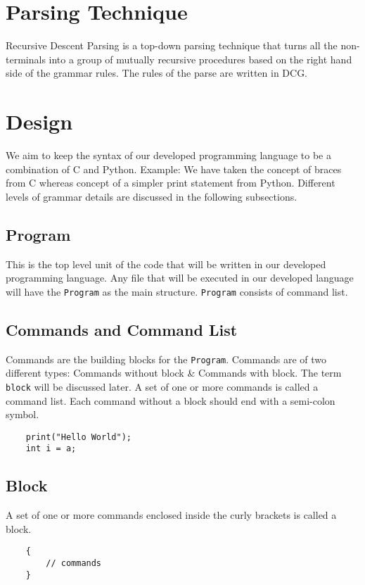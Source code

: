 \documentclass[12pt,letterpaper]{article}
\begin{document}
\section{Parsing Technique}
Recursive Descent Parsing is a top-down parsing technique that turns all the non-terminals into a group of mutually recursive procedures based on the right hand side of the grammar rules. The rules of the parse are written in DCG.

\section{Design}
We aim to keep the syntax of our developed programming language to be a combination of C and Python. Example: We have taken the concept of braces from C whereas concept of a simpler print statement from Python. Different levels of grammar details are discussed in the following subsections.

\subsection{Program}
This is the top level unit of the code that will be written in our developed programming language. Any file that will be executed in our developed language will have the \texttt{Program} as the main structure.
\texttt{Program} consists of command list.

\subsection{Commands and Command List}
Commands are the building blocks for the \texttt{Program}. Commands are of two different types: Commands without block \& Commands with block. The term \texttt{block} will be discussed later. A set of one or more commands is called a command list. Each command without a block should end with a semi-colon symbol.
\begin{verbatim}
    print("Hello World");
    int i = a;
\end{verbatim}

\subsection{Block}
A set of one or more commands enclosed inside the curly brackets is called a block.

\begin{verbatim}
    {
        // commands
    }
\end{verbatim}
\end{document}
